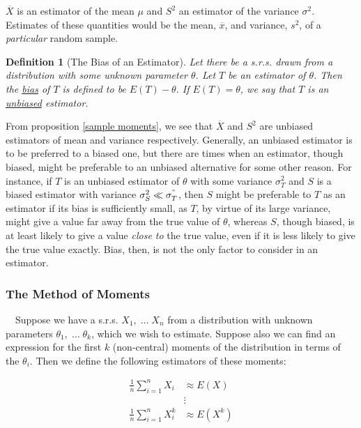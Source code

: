 \documentclass[12pt,a4paper]{article}
\newtheorem{defn}[thm]{Definition}
\begin{document}
$\overline{X}$ is an estimator of the mean $\mu$ and $S^2$ an estimator of the variance $\sigma^2$. Estimates of these quantities would be the mean, $\overline{x}$, and variance, $s^2$, of a \emph{particular} random sample.

\begin{defn}[The Bias of an Estimator]\vspace{1cm}

Let there be a s.r.s. drawn from a distribution with some unknown parameter $\theta$. Let $T$ be an estimator of $\theta$. Then the \underline{bias} of $T$ is defined to be $E(T) - \theta$. If $E(T) = \theta$, we say that $T$ is an \underline{unbiased} estimator.

\end{defn}

From proposition \ref{sample moments}, we see that $\overline{X}$ and $S^2$ are unbiased estimators of mean and variance respectively. Generally, an unbiased estimator is to be preferred to a biased one, but there are times when an estimator, though biased, might be preferable to an unbiased alternative for some other reason. For instance, if $T$ is an unbiased estimator of $\theta$ with some variance $\sigma_T^2$ and $S$ is a biased estimator with variance $\sigma_S^2\ll \sigma^"_T$, then $S$ might be preferable to $T$ as an estimator if its bias is sufficiently small, as $T$, by virtue of its large variance, might give a value far away from the true value of $\theta$, whereas $S$, though biased, is at least likely to give a value \emph{close to} the true value, even if it is less likely to give the true value exactly. Bias, then, is not the only factor to consider in an estimator.

\subsubsection{The Method of Moments}

$\quad$Suppose we have a s.r.s. $X_1,\;\hdots\; X_n$ from a distribution with unknown parameters $\theta_1,\;\hdots\; \theta_k$, which we wish to estimate. Suppose also we can find an expression for the first $k$ (non-central) moments of the distribution in terms of the $\theta_i$. Then we define the following estimators of these moments:

\begin{align*}
\frac{1}{n}\sum_{i=1}^n X_i &\approx E(X)\\
&\vdots\\
\frac{1}{n}\sum_{i=1}^n X_i^k &\approx E(X^k)
\end{align*}
\end{document}
